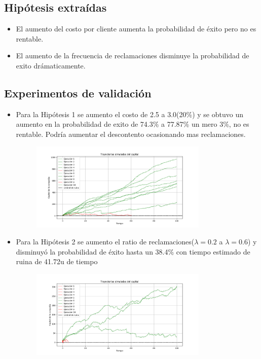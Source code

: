 \documentclass[12pt, a4paper]{article}
\begin{document}
\subsection*{Hipótesis extraídas}
\begin{itemize}
    \item El aumento del costo por cliente aumenta la probabilidad de éxito pero no es rentable.
    \item El aumento de la frecuencia de reclamaciones disminuye la probabilidad de exito drámaticamente.
\end{itemize}

\subsection*{Experimentos de validación}
\begin{itemize}
    \item Para la Hipótesis 1 se aumento el costo de 2.5 a 3.0(20\%) y se obtuvo un aumento en la probabilidad de exito de 74.3\% a 77.87\% un mero 3\%, no es rentable. Podría aumentar el descontento ocasionando mas reclamaciones.
    \begin{figure}[h]
        \centering
        \includegraphics[width=0.8\textwidth]{Figure_2.png}
    
        \label{fig:2}
    \end{figure}
    \item Para la Hipótesis 2 se aumento el ratio de reclamaciones($\lambda = 0.2$ a $\lambda = 0.6$) y disminuyó la probabilidad de éxito hasta un 38.4\% con tiempo estimado de ruina de 41.72u de tiempo
    \begin{figure}[h]
        \centering
        \includegraphics[width=0.8\textwidth]{Figure_3.png}
    
        \label{fig:3}
    \end{figure}
\end{itemize}
\newpage
\end{document}
